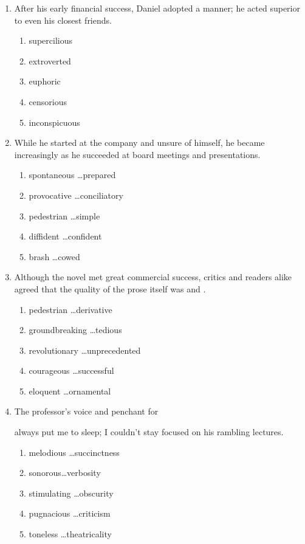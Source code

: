 \documentclass[12pt]{book}
\newcommand{\longline}{\underline{\hspace{2in}} }
\begin{document}
\begin{enumerate}
\newpage
\item After his early financial success, Daniel adopted a \longline  manner; he acted superior to even his closest friends.
\begin{enumerate}[label=(\Alph*)]
\item supercilious
\item extroverted
\item euphoric
\item censorious
\item inconspicuous
\end{enumerate}

\bigskip
\item While he started at the company \longline and unsure of himself, he became increasingly \longline as he succeeded at board meetings and presentations.
\begin{enumerate}[label=(\Alph*)]
\item spontaneous \ldots prepared
\item provocative \ldots conciliatory
\item pedestrian \ldots simple
\item diffident \ldots confident  
\item brash \ldots cowed
\end{enumerate}

\bigskip
\item Although the novel met great commercial success, critics and readers alike agreed that the quality of the prose itself was \longline and \hrulefill.
\begin{enumerate}[label=(\Alph*)]
\item pedestrian \ldots derivative
\item groundbreaking \ldots tedious
\item revolutionary \ldots unprecedented
\item courageous \ldots successful 
\item eloquent \ldots ornamental
\end{enumerate}

\bigskip
\item The professor's \longline voice and penchant for \hrulefill

always put me to sleep; I couldn't stay focused on his rambling lectures.
\begin{enumerate}[label=(\Alph*)]
\item melodious \ldots succinctness
\item sonorous\ldots verbosity
\item stimulating \ldots obscurity
\item pugnacious \ldots criticism 
\item toneless \ldots theatricality
\end{enumerate}


\end{enumerate}
\end{document}
